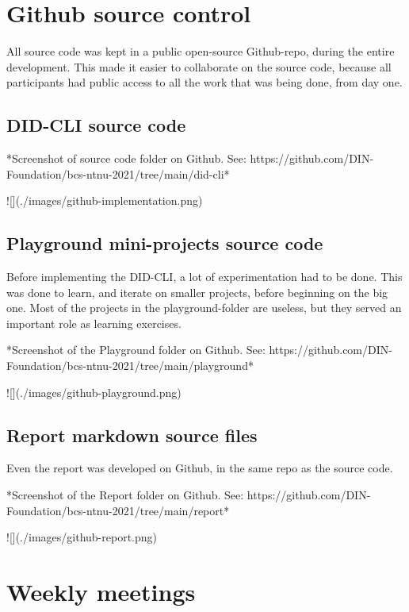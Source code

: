 \section{Github source control}

All source code was kept in a public open-source Github-repo, during the entire development. This made it easier to collaborate on the source code, because all participants had public access to all the work that was being done, from day one.

\subsection{DID-CLI source code}

*Screenshot of source code folder on Github. See: https://github.com/DIN-Foundation/bcs-ntnu-2021/tree/main/did-cli*

![](./images/github-implementation.png)

\subsection{Playground mini-projects source code}

Before implementing the DID-CLI, a lot of experimentation had to be done. This was done to learn, and iterate on smaller projects, before beginning on the big one. Most of the projects in the playground-folder are useless, but they served an important role as learning exercises.

*Screenshot of the Playground folder on Github. See: https://github.com/DIN-Foundation/bcs-ntnu-2021/tree/main/playground*

![](./images/github-playground.png)


\subsection{Report markdown source files}

Even the report was developed on Github, in the same repo as the source code.

*Screenshot of the Report folder on Github. See: https://github.com/DIN-Foundation/bcs-ntnu-2021/tree/main/report*

![](./images/github-report.png)




\section{Weekly meetings}

